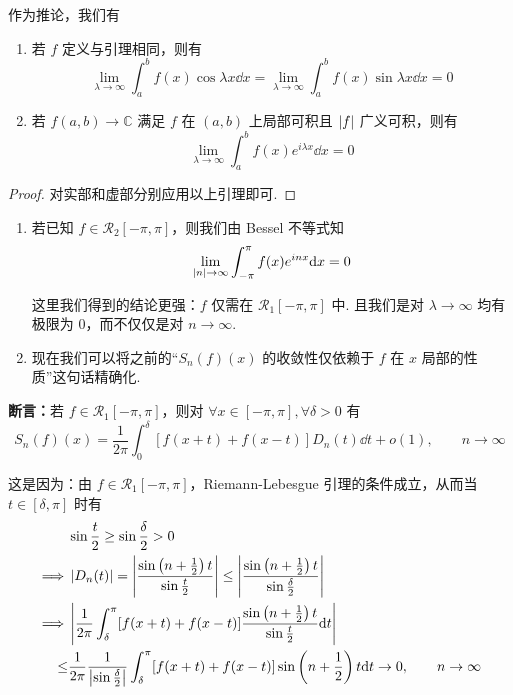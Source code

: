 作为推论，我们有

\begin{inference}
    \begin{enumerate}
        \item 若 $f$ 定义与引理相同，则有
$$
\lim_{\lambda\to\infty}\int_a^bf(x)\cos\lambda x\dd x=\lim_{\lambda\to\infty}\int_a^bf(x)\sin\lambda x\dd x=0
$$

        \item 若 $f(a,b)\to\mathbb{C}$ 满足 $f$ 在 $(a,b)$ 上局部可积且 $\left\lvert{f}\right\rvert$ 广义可积，则有
$$
\lim_{\lambda\to\infty}\int_a^b f(x)e^{i\lambda x}\dd x=0
$$
    \end{enumerate}
\end{inference}
\begin{proof}
    对实部和虚部分别应用以上引理即可.
\end{proof}

\begin{hint}
    \begin{enumerate}
        \item 若已知 $f\in \mathcal{R}_2[-\pi,\pi]$，则我们由 Bessel 不等式知
$$
\lim_{\left\lvert{n}\right\rvert\to\infty}\int_{-\pi}^{\pi}f(x)e^{inx}\mathrm{d} x=0
$$

        这里我们得到的结论更强：$f$ 仅需在 $\mathcal{R}_1[-\pi,\pi]$ 中. 且我们是对 $\lambda\to\infty$ 均有极限为 $0$，而不仅仅是对 $n\to\infty$.

        \item 现在我们可以将之前的“$S_n(f)(x)$ 的收敛性仅依赖于 $f$ 在 $x$ 局部的性质”这句话精确化.
    \end{enumerate}
\end{hint}

\textbf{断言：}若 $f\in\mathcal{R}_1[-\pi,\pi]$，则对 $\forall x\in[-\pi,\pi],\forall\delta>0$ 有
$$
S_n(f)(x)=\frac{1}{2\pi}\int_0^{\delta}[f(x+t)+f(x-t)]D_n(t)\dd t+o(1),\qquad n\to\infty
$$

这是因为：由 $f\in\mathcal{R}_1[-\pi,\pi]$，Riemann-Lebesgue 引理的条件成立，从而当 $t\in[\delta,\pi]$ 时有
$$
\begin{aligned}
    &\sin\frac{t}{2}\ge\sin\frac{\delta}{2}>0\\
    \implies&\left\lvert{D_n(t)}\right\rvert=\left\lvert{\frac{\sin\left(n+\frac{1}{2}\right)t}{\sin\frac{t}{2}}}\right\rvert\le\left\lvert{\frac{\sin\left(n+\frac{1}{2}\right)t}{\sin\frac{\delta}{2}}}\right\rvert\\
    \implies&\left\lvert{\frac{1}{2\pi}\int_\delta^\pi[f(x+t)+f(x-t)]\frac{\sin\left(n+\frac{1}{2}\right)t}{\sin\frac{t}{2}}\mathrm{d}t}\right\rvert\\
    \le&\frac{1}{2\pi}\frac{1}{\left\lvert{\sin\frac{\delta}{2}}\right\rvert}\int_\delta^\pi[f(x+t)+f(x-t)]\sin\left(n+\frac{1}{2}\right)t\mathrm{d} t\to 0,\qquad n\to\infty
\end{aligned}
$$

